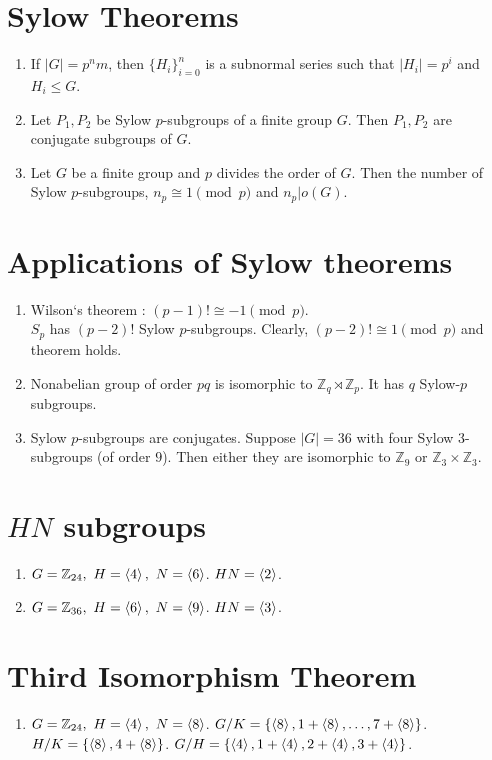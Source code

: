 \section{Sylow Theorems}
\begin{enumerate}
	\item If $|G|=p^nm$, then $\{ H_i \}_{i=0}^n$ is a subnormal series such that $|H_i| = p^i$ and $H_i \le G$.
	\item Let $P_1,P_2$ be Sylow $p$-subgroups of a finite group $G$. Then $P_1,P_2$ are conjugate subgroups of $G$.
	\item Let $G$ be a finite group and $p$ divides the order of $G$.
	Then the number of Sylow $p$-subgroups, $n_p \cong 1 \pmod{p}$ and $n_p|o(G)$.
\end{enumerate}

\section{Applications of Sylow theorems}
\begin{enumerate}
	\item Wilson`s theorem : $(p-1)! \cong -1 \pmod{p}$.\\
	$S_p$ has $(p-2)!$ Sylow $p$-subgroups.
	Clearly, $(p-2)! \cong 1 \pmod{p}$ and theorem holds.
	\item Nonabelian group of order $pq$ is isomorphic to $\mathbb{Z}_q \rtimes \mathbb{Z}_p$. It has $q$ Sylow-$p$ subgroups.
	\item Sylow $p$-subgroups are conjugates.
		Suppose $|G|=36$ with four Sylow $3$-subgroups (of order $9$). Then either they are isomorphic to $\mathbb{Z}_9$ or $\mathbb{Z}_3 \times \mathbb{Z}_3$.
\end{enumerate}

\section{$HN$ subgroups}
\begin{enumerate}
	\item $G = \mathbb{Z}_{24},\ H = \left\langle 4 \right\rangle,\ N = \left\langle 6 \right\rangle$. $HN = \left\langle 2 \right\rangle$.
	\item $G = \mathbb{Z}_{36},\ H = \left\langle 6 \right\rangle,\ N = \left\langle 9 \right\rangle$. $HN = \left\langle 3 \right\rangle$.
\end{enumerate}

\section{Third Isomorphism Theorem}
\begin{enumerate}
	\item $G = \mathbb{Z}_{24},\ H = \left\langle 4 \right\rangle,\ N = \left\langle 8 \right\rangle$. 
	$G/K = \{ \left\langle 8 \right\rangle, 1 + \left\langle 8 \right\rangle, \dots, 7+\left\langle 8 \right\rangle \}$.\\
	$H/K = \{ \left\langle 8 \right\rangle, 4+\left\langle 8 \right\rangle \}$.
	$G/H = \{ \left\langle 4 \right\rangle, 1+\left\langle 4 \right\rangle, 2+\left\langle 4 \right\rangle, 3+\left\langle 4 \right\rangle \}$.
\end{enumerate}

